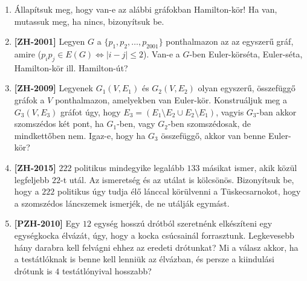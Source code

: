 \documentclass[a4paper,12pt]{article}
\begin{document}
        \noindent{}
        \noindent{}
        \begin{enumerate}

            \item Állapítsuk meg, hogy van-e az alábbi gráfokban Hamilton-kör! Ha van, mutassuk meg, ha nincs, bizonyítsuk be.
            \begin{figure}[!h]
                \centering
                \begin{subfigure}{0.3\textwidth}
                    \centering
                    
                \end{subfigure}
                \begin{subfigure}{0.3\textwidth}
                    \centering
                    
                \end{subfigure}
            \end{figure}

            \item \textbf{[ZH-2001]} Legyen $G$ a $\{p_1, p_2, \ldots, p_{2001}\}$ ponthalmazon az az egyszerű gráf, amire ($p_i p_j \in E(G) \Leftrightarrow |i-j| \le 2$). Van-e a $G$-ben Euler-körséta, Euler-séta, Hamilton-kör ill. Hamilton-út?

            \item \textbf{[ZH-2009]} Legyenek $G_1(V,E_1)$ és $G_2(V,E_2)$ olyan egyszerű, összefüggő gráfok a $V$ ponthalmazon, amelyekben van Euler-kör. Konstruáljuk meg a $G_3(V,E_3)$ gráfot úgy, hogy $E_3=(E_1\setminus E_2 \cup E_2 \setminus E_1)$, vagyis $G_3$-ban akkor szomszédos két pont, ha $G_1$-ben, vagy $G_2$-ben szomszédosak, de mindkettőben nem. Igaz-e, hogy ha $G_3$ összefüggő, akkor van benne Euler-kör?

            \item \textbf{[ZH-2015]} $222$ politikus mindegyike legalább $133$ másikat ismer, akik közül legfeljebb $22$-t utál. Az ismeretség és az utálat is kölcsönös. Bizonyítsuk be, hogy a $222$ politikus úgy tudja élő lánccal körülvenni a Tüskecsarnokot, hogy a szomszédos láncszemek ismerjék, de ne utálják egymást.

            \item \textbf{[PZH-2010]} Egy $12$ egység hosszú drótból szeretnénk elkészíteni egy egységkocka élvázát, úgy, hogy a kocka csúcsainál forrasztunk. Legkevesebb hány darabra kell felvágni ehhez az eredeti drótunkat? Mi a válasz akkor, ha a testátlóknak is benne kell lenniük az élvázban, és persze a kiindulási drótunk is $4$ testátlónyival hosszabb?


\end{enumerate}
\end{document}
